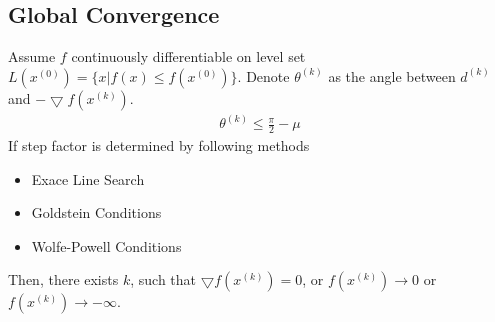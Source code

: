\subsection{Global Convergence}
\begin{theorem}
    Assume $f$ continuously differentiable
    on level set $L(x^{(0)}) = \{ x | f(x) \leq f(x^{(0)})\}$.
    Denote $\theta^{(k)}$ as the angle between $d^{(k)}$
    and $-\bigtriangledown f(x^{(k)})$.
    \begin{align}
        \theta^{(k)} \leq \frac{\pi}{2} - \mu
        \label{equ:global-convergence1}
    \end{align}
    If step factor is determined by following methods
    \begin{itemize}
        \item Exace Line Search
        \item Goldstein Conditions
        \item Wolfe-Powell Conditions
    \end{itemize}
    Then, there exists $k$, such that $\bigtriangledown f(x^{(k)}) = 0$,
    or $f(x^{(k)}) \rightarrow 0$ or $f(x^{(k)}) \rightarrow - \infty$.
\end{theorem}
